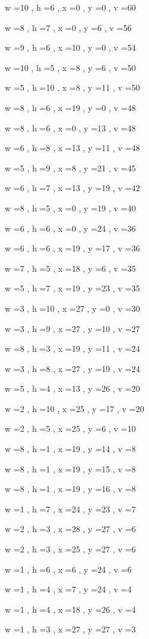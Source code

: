\documentclass[11pt]{article}
\begin{document}
w =10 , h =6 , x =0 , y =0 , v =60
\par
w =8 , h =7 , x =0 , y =6 , v =56
\par
w =9 , h =6 , x =10 , y =0 , v =54
\par
w =10 , h =5 , x =8 , y =6 , v =50
\par
w =5 , h =10 , x =8 , y =11 , v =50
\par
w =8 , h =6 , x =19 , y =0 , v =48
\par
w =8 , h =6 , x =0 , y =13 , v =48
\par
w =6 , h =8 , x =13 , y =11 , v =48
\par
w =5 , h =9 , x =8 , y =21 , v =45
\par
w =6 , h =7 , x =13 , y =19 , v =42
\par
w =8 , h =5 , x =0 , y =19 , v =40
\par
w =6 , h =6 , x =0 , y =24 , v =36
\par
w =6 , h =6 , x =19 , y =17 , v =36
\par
w =7 , h =5 , x =18 , y =6 , v =35
\par
w =5 , h =7 , x =19 , y =23 , v =35
\par
w =3 , h =10 , x =27 , y =0 , v =30
\par
w =3 , h =9 , x =27 , y =10 , v =27
\par
w =8 , h =3 , x =19 , y =11 , v =24
\par
w =3 , h =8 , x =27 , y =19 , v =24
\par
w =5 , h =4 , x =13 , y =26 , v =20
\par
w =2 , h =10 , x =25 , y =17 , v =20
\par
w =2 , h =5 , x =25 , y =6 , v =10
\par
w =8 , h =1 , x =19 , y =14 , v =8
\par
w =8 , h =1 , x =19 , y =15 , v =8
\par
w =8 , h =1 , x =19 , y =16 , v =8
\par
w =1 , h =7 , x =24 , y =23 , v =7
\par
w =2 , h =3 , x =28 , y =27 , v =6
\par
w =2 , h =3 , x =25 , y =27 , v =6
\par
w =1 , h =6 , x =6 , y =24 , v =6
\par
w =1 , h =4 , x =7 , y =24 , v =4
\par
w =1 , h =4 , x =18 , y =26 , v =4
\par
w =1 , h =3 , x =27 , y =27 , v =3
\par
\newpage
\end{document}
